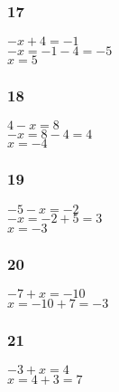 \documentclass[]{report}
\begin{document}
\subsubsection{17}
$ -x + 4 = -1 $ \\
$ -x = -1 -4 = -5 $ \\
$ x = 5 $

\subsubsection{18}
$ 4 - x = 8 $ \\
$ -x = 8 - 4  = 4 $ \\
$ x = -4 $


\subsubsection{19}
$ -5 -x = -2 $ \\
$ -x = -2 + 5 = 3 $ \\
$ x = -3 $

\subsubsection{20}
$ -7 + x = - 10 $ \\
$ x = - 10 + 7 = -3 $

\subsubsection{21}
$ -3 + x = 4 $ \\
$ x = 4 + 3 = 7 $
\end{document}
